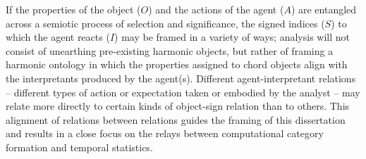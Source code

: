 If the properties of the object ($O$) and the actions of the agent ($A$) are entangled across a semiotic process of selection and significance, the signed indices ($S$) to which the agent reacts ($I$) may be framed in a variety of ways; analysis will not consist of unearthing pre-existing harmonic objects, but rather of framing a harmonic ontology in which the properties assigned to chord objects align with the interpretants produced by the agent(s).  Different agent-interpretant relations -- different types of action or expectation taken or embodied by the analyst -- may relate more directly to certain kinds of object-sign relation than to others.  This alignment of relations between relations guides the framing of this dissertation and results in a close focus on the relays between computational category formation and temporal statistics.

